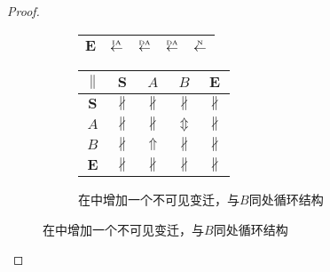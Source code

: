 \begin{proof}
\begin{figure}[htbp]
\begin{subfigure}{1\textwidth}
\begin{minipage}[b]{0.3\textwidth}
\begin{tabular}{|c|c|c|c|c|}
        $\bm{E}$ & $\overset{\text{\tiny{IA}}}{\leftarrow}$ & $\overset{\text{\tiny{DA}}}{\leftarrow}$ & $\overset{\text{\tiny{DA}}}{\leftarrow}$ & $\overset{\text{\tiny{N}}}{\leftarrow}$\\ \hline
      \end{tabular}
    \end{minipage}
    \begin{minipage}[b]{0.3\textwidth}
      \vspace{1em}
      \centering
      \begin{tabular}{|c|c|c|c|c|} \hline
        $\parallel$ & $\bm{S}$ & $A$ & $B$ & $\bm{E}$\\ \hline
        $\bm{S}$ & $\nparallel$ & $\nparallel$ & $\nparallel$ & $\nparallel$\\ \hline
        $A$ & $\nparallel$ & $\nparallel$ & $\Updownarrow$ & $\nparallel$\\ \hline
        $B$ & $\nparallel$ & $\Uparrow$ & $\nparallel$ & $\nparallel$\\ \hline
        $\bm{E}$ & $\nparallel$ & $\nparallel$ & $\nparallel$ & $\nparallel$\\ \hline
      \end{tabular}
    \end{minipage}
    \caption{在中增加一个不可见变迁，与$B$同处循环结构}
    \label{fig:uniqueness_3_h}
  \end{subfigure}


\end{figure}
\end{proof}
